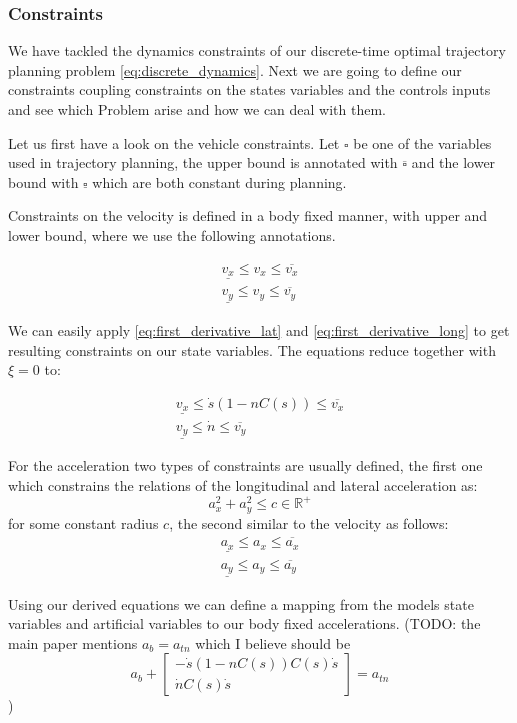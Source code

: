 \subsubsection{Constraints}

We have tackled the dynamics constraints of our discrete-time optimal trajectory planning problem \ref{eq:discrete_dynamics}.
Next we are going to define our constraints coupling constraints on the states variables and the controls inputs and see which Problem arise and how
we can deal with them.

Let us first have a look on the vehicle constraints.
Let $\square$ be one of the variables used in trajectory planning, the upper bound is annotated with $\overline{\square}$ and the lower bound with
$\underline{\square}$ which are both constant during planning.

Constraints on the velocity is defined in a body fixed manner, with upper and lower bound, where we use the following annotations.

\begin{align}
	\underline{v_x} \leq v_x \leq \overline{v_x} \\
	\underline{v_y} \leq v_y \leq \overline{v_y}
\end{align}

We can easily apply \ref{eq:first_derivative_lat} and \ref{eq:first_derivative_long} to get resulting constraints on our state variables.
The equations reduce together with $\xi = 0$ to:

\begin{align}
	\underline{v_x}  \leq  \dot{s}(1-nC(s))  \leq  \overline{v_x} \\
	\underline{v_y}  \leq  \dot{n}           \leq  \overline{v_y}
\end{align}

For the acceleration two types of constraints are usually defined, the first one which constrains the relations of the longitudinal and lateral acceleration as:
\begin{equation}
	a_x^2 + a_y^2 \leq c \in \mathbb{R}^+
\end{equation}
for some constant radius $c$, the second similar to the velocity as follows:
\begin{align}
	\underline{a_x} \leq a_x \leq \overline{a_x} \\
	\underline{a_y} \leq a_y \leq \overline{a_y}
\end{align}

Using our derived equations we can define a mapping from the models state variables and artificial variables to our body fixed accelerations.
(TODO: the main paper mentions $a_b = a_{tn}$ which I believe should be \[
	a_b + \begin{bmatrix}
		-\dot{s}(1-nC(s))C(s)\dot{s} \\
		\dot{n}C(s)\dot{s}
	\end{bmatrix} = a_{tn}\])

